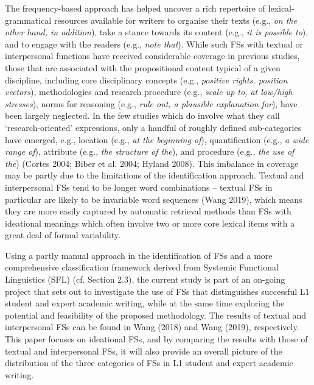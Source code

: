 \begin{styleStandard}
The frequency-based approach has helped uncover a rich repertoire of lexical-grammatical resources available for writers to organise their texts (e.g., \textit{on the other hand, in addition}), take a stance towards its content (e.g., \textit{it is possible to}), and to engage with the readers (e.g., \textit{note that}). While such FSs with textual or interpersonal functions have received considerable coverage in previous studies, those that are associated with the propositional content typical of a given discipline, including core disciplinary concepts (e.g., \textit{positive rights, position vectors}), methodologies and research procedure (e.g., \textit{scale up to, at low/high stresses}), norms for reasoning (e.g., \textit{rule out, a plausible explanation for}), have been largely neglected. In the few studies which do involve what they call ‘research-oriented’ expressions, only a handful of roughly defined sub-categories have emerged, e.g., location (e.g., \textit{at the beginning of}), quantification (e.g., \textit{a wide range of}), attribute (e.g., \textit{the structure of the}), and procedure (e.g., \textit{the use of the}) (Cortes 2004; Biber et al. 2004; Hyland 2008). This imbalance in coverage may be partly due to the limitations of the identification approach. Textual and interpersonal FSs tend to be longer word combinations – textual FSs in particular are likely to be invariable word sequences (Wang 2019), which means they are more easily captured by automatic retrieval methods than FSs with ideational meanings which often involve two or more core lexical items with a great deal of formal variability. 
\end{styleStandard}

\begin{styleStandard}
Using a partly manual approach in the identification of FSs and a more comprehensive classification framework derived from Systemic Functional Linguistics (SFL) (cf. Section 2.3), the current study is part of an on-going project that sets out to investigate the use of FSs that distinguishes successful L1 student and expert academic writing, while at the same time exploring the potential and feasibility of the proposed methodology. The results of textual and interpersonal FSs can be found in Wang (2018) and Wang (2019), respectively. This paper focuses on ideational FSs, and by comparing the results with those of textual and interpersonal FSs, it will also provide an overall picture of the distribution of the three categories of FSs in L1 student and expert academic writing.
\end{styleStandard}

